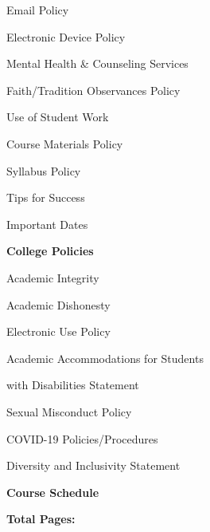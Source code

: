 \documentclass[11pt,letterpaper]{article}
\begin{document}
\begin{minipage}[t]{0.45\textwidth}
\hspace{0.3cm} Email Policy \dotfill \pageref{email_policy} 
%
\end{minipage}\hfill\begin{minipage}[t]{0.45\textwidth} \par
\hspace{0.3cm} Electronic Device Policy \dotfill \pageref{electronic} \par
\hspace{0.3cm} Mental Health \& Counseling Services \dotfill \pageref{mental_health} \par
\hspace{0.3cm} Faith/Tradition Observances Policy \dotfill \pageref{faith} \par
\hspace{0.3cm} Use of Student Work \dotfill \pageref{std_work} \par
\hspace{0.3cm} Course Materials Policy \dotfill \pageref{copyright} \par
\hspace{0.3cm} Syllabus Policy \dotfill \pageref{syllabus} \par
\hspace{0.3cm} Tips for Success \dotfill \pageref{tips} \par
\hspace{0.3cm} Important Dates \dotfill \pageref{imp_dates} \par
{\bfseries\color{stacred} College Policies} \dotfill \pageref{college_polc} \par
\hspace{0.3cm} Academic Integrity \dotfill \pageref{college_acadint} \par
\hspace{0.3cm} Academic Dishonesty \dotfill \pageref{college_acaddis} \par
\hspace{0.3cm} Electronic Use Policy \dotfill \pageref{college_elecuse} \par
\hspace{0.3cm} Academic Accommodations for Students \par
\hspace{0.6cm} with Disabilities Statement \dotfill \pageref{college_acadacc} \par
\hspace{0.3cm} Sexual Misconduct Policy \dotfill \pageref{college_sexmisconduct} \par
\hspace{0.3cm} COVID-19 Policies/Procedures \dotfill \pageref{college_healthsafety} \par
\hspace{0.3cm} Diversity and Inclusivity Statement \dotfill \pageref{college_inclusive} \par
{\bfseries\color{stacred} Course Schedule} \dotfill \pageref{schd} \par
\hfill {\bfseries\color{stacred} Total Pages:} \pageref*{LastPage}
\end{minipage}
\sectionbreak
\end{document}

